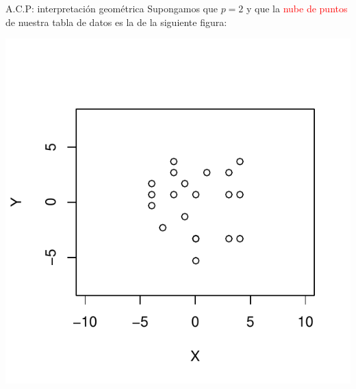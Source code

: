 \documentclass[
  ignorenonframetext,
]{beamer}
\newcommand\red[1]{\textcolor{red}{#1}}
\begin{document}
\begin{frame}{A.C.P: interpretación geométrica}
\label{a.c.p-interpretaciuxf3n-geomuxe9trica}
Supongamos que \(p=2\) y que la \red{nube de puntos} de nuestra tabla de
datos es la de la siguiente figura:

\begin{center}\includegraphics{AnalisisComponentesPrincipales_fusion_files/figure-beamer/inter_geom1-1} \end{center}
\end{frame}
\end{document}
